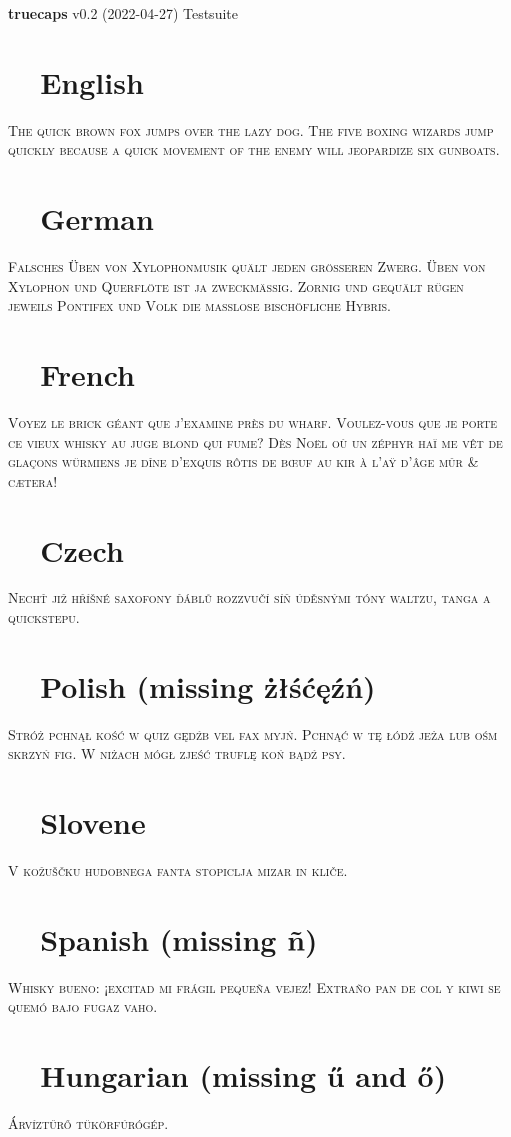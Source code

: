 \documentclass{article}
\def\checkno	{\textcolor{red}{\textbf{\ding{55}~~}}}
\def\checkyes	{\textcolor{green}{\textbf{\ding{51}~~}}}
\begin{document}
\hfill{\Large \textbf{truecaps} v0.2 (2022-04-27) Testsuite}

\vspace{-1em}\section*{\checkyes English}
\textsc{The quick brown fox jumps over the lazy dog.
The five boxing wizards jump quickly because 
a quick movement of the enemy will jeopardize six gunboats.}

\vspace{-1em}\section*{\checkyes German}
\noindent\textsc{Falsches Üben von Xylophonmusik quält jeden größeren Zwerg.
Üben von Xylophon und Querflöte ist ja zweckmäßig. 
Zornig und gequält rügen jeweils Pontifex und Volk die maßlose bischöfliche Hybris.}

\vspace{-1em}\section*{\checkyes French}
\noindent\textsc{Voyez le brick géant que j’examine près du wharf.
Voulez-vous que je porte ce vieux whisky au juge blond qui fume\medspace?
Dès Noël où un zéphyr haï me vêt de glaçons würmiens 
je dîne d’exquis rôtis de bœuf au kir à l’aÿ d’âge mûr \& cætera\medspace!}

\vspace{-1em}\section*{\checkyes Czech}
\noindent\textsc{Nechť již hříšné saxofony ďáblů rozzvučí síň úděsnými 
tóny waltzu, tanga a quickstepu.}

\vspace{-1em}\section*{\checkno Polish (missing \string żłśćęźń)}
\noindent\textsc{
Stróż pchnął kość w quiz gędźb vel fax myjń. 
Pchnąć w tę łódź jeża lub ośm skrzyń fig.
W niżach mógł zjeść truflę koń bądź psy.
}

\vspace{-1em}\section*{\checkno Slovene}
\noindent\textsc{
V kožuščku hudobnega fanta stopiclja mizar in kliče.
}

\vspace{-1em}\section*{\checkno Spanish (missing ñ)}
\noindent\textsc{
Whisky bueno: ¡excitad mi frágil pequeña vejez!
Extraño pan de col y kiwi se quemó bajo fugaz vaho. 
}

\vspace{-1em}\section*{\checkno Hungarian (missing ű and ő)}
\noindent\textsc{
Árvíztűrő tükörfúrógép.
}
\end{document}
